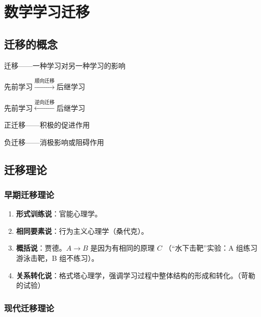 \chapter{数学学习迁移}

\section{迁移的概念}

迁移——一种学习对另一种学习的影响

先前学习$\xrightarrow{\text{顺向迁移}}$后继学习

先前学习$\xleftarrow{\text{逆向迁移}}$后继学习

正迁移——积极的促进作用

负迁移——消极影响或阻碍作用

\section{迁移理论}

\subsection{早期迁移理论}

\begin{enumerate}
    \item \textbf{形式训练说}：官能心理学。
    \item \textbf{相同要素说}：行为主义心理学（桑代克）。
    \item \textbf{概括说}：贾德。$A \to B$ 是因为有相同的原理 $C$ （“水下击靶”实验：A 组练习游泳击靶，B 组不练习）。
    \item \textbf{关系转化说}：格式塔心理学，强调学习过程中整体结构的形成和转化。（苛勒的试验）
\end{enumerate}



\subsection{现代迁移理论}


